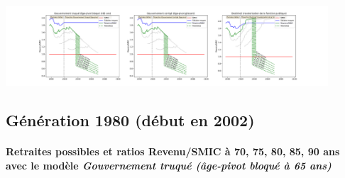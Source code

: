 \begin{center}\includegraphics[width=0.9\textwidth]{fig/SecretaireAdmin_1975_22_dest_retraite.pdf}\end{center} \label{fig/SecretaireAdmin_1975_22_dest_retraite.pdf} 

\newpage 
 
\subsection{Génération 1980 (début en 2002)} 

\paragraph{Retraites possibles et ratios Revenu/SMIC à 70, 75, 80, 85, 90 ans avec le modèle \emph{Gouvernement truqué (âge-pivot bloqué à 65 ans)}}  
 
